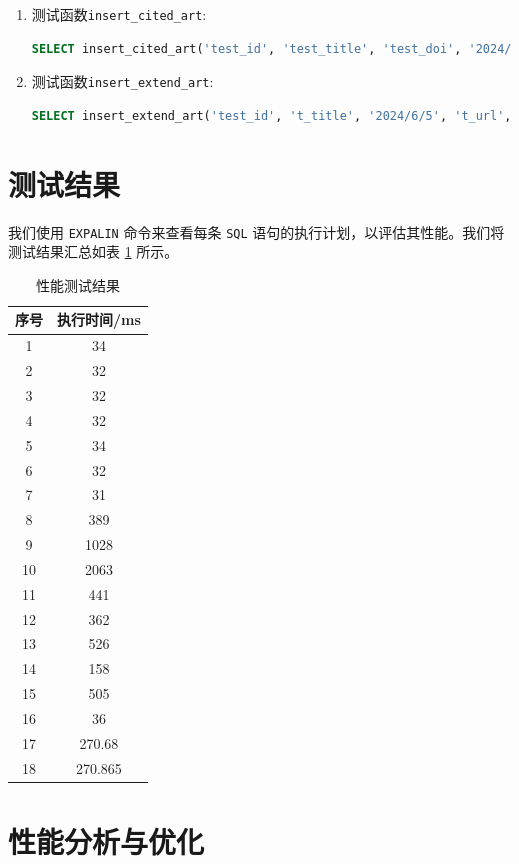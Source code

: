 \documentclass[UTF8,openany]{ctexbook}
\begin{document}
\begin{enumerate}[label=\textbf{\arabic*}]
  \item 测试函数\texttt{insert\_cited\_art}:
  \begin{lstlisting}[language=sql]
SELECT insert_cited_art('test_id', 'test_title', 'test_doi', '2024/6/5', 'test_journal', 'test_volume', 'test_in_pages', '0;1');
  \end{lstlisting}

  \item 测试函数\texttt{insert\_extend\_art}:
  \begin{lstlisting}[language=sql]
SELECT insert_extend_art('test_id', 't_title', '2024/6/5', 't_url', 't_type', 't_addr', 't_cha', 't_focus', 't_journal');
  \end{lstlisting}
\end{enumerate}

\section{测试结果}

我们使用 \texttt{EXPALIN} 命令来查看每条 \texttt{SQL} 语句的执行计划，以评估其性能。我们将测试结果汇总如表 \ref{tab:performance} 所示。

\begin{table}[H]
  \caption{性能测试结果}
  \centering
\label{tab:performance}
\begin{tabular}{cc}
\toprule
\textbf{序号} &  \textbf{执行时间/ms} \\ 
\midrule
1	&34 \\
2	&32 \\
3	&32 \\
4	&32 \\
5	&34 \\
6	&32 \\
7	&31 \\
8	&389 \\
9	&1028 \\
10&	2063 \\
11&	441 \\
12&	362 \\
13&	526 \\
14&	158 \\
15&	505 \\
16&	36 \\
17&	270.68 \\
18&	270.865 \\
\bottomrule
\end{tabular}
\end{table}

\section{性能分析与优化}
\end{document}
